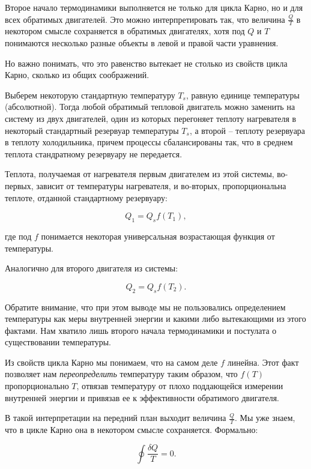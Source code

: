 \documentclass{article}
\begin{document}
\begin{section}{Второе начало термодинамики}
		выполняется не только для цикла Карно, но и для всех обратимых двигателей. Это можно интерпретировать так, что величина $\frac{Q}{T}$ в некотором смысле сохраняется в обратимых двигателях, хотя под $Q$ и $T$ понимаются несколько разные объекты в левой и правой части уравнения.

		Но важно понимать, что это равенство вытекает не столько из свойств цикла Карно, сколько из общих соображений.

		Выберем некоторую стандартную температуру $T_s$, равную единице температуры (абсолютной). Тогда любой обратимый тепловой двигатель можно заменить на систему из двух двигателей, один из которых перегоняет теплоту нагревателя в некоторый стандартный резервуар температуры $T_s$, а второй -- теплоту резервуара в теплоту холодильника, причем процессы сбалансированы так, что в среднем теплота стандратному резервуару не передается.

		Теплота, получаемая от нагревателя первым двигателем из этой системы, во-первых, зависит от температуры нагревателя, и во-вторых, пропорциональна теплоте, отданной стандартному резервуару:

		\begin{equation*}
			Q_1 = Q_s f(T_1),
		\end{equation*}

		где под $f$ понимается некоторая универсальная возрастающая функция от температуры.

		Аналогично для второго двигателя из системы:

		\begin{equation*}
			Q_2 = Q_s f(T_2).
		\end{equation*}

		Обратите внимание, что при этом выводе мы не пользовались определением температуры как меры внутренней энергии и какими либо вытекающими из этого фактами. Нам хватило лишь второго начала термодинамики и постулата о существовании температуры.

		Из свойств цикла Карно мы понимаем, что на самом деле $f$ линейна. Этот факт позволяет нам \textit{переопределить} температуру таким образом, что $f(T)$ пропорционально $T$, отвязав температуру от плохо поддающейся измерении внутренней энергии и привязав ее к эффективности обратимого двигателя.

		В такой интерпретации на передний план выходит величина $\frac{Q}{T}$. Мы уже знаем, что в цикле Карно она в некотором смысле сохраняется. Формально:

		\begin{equation*}
			\oint \frac{\delta Q}{T} = 0.
		\end{equation*}


\end{section}
\end{document}
